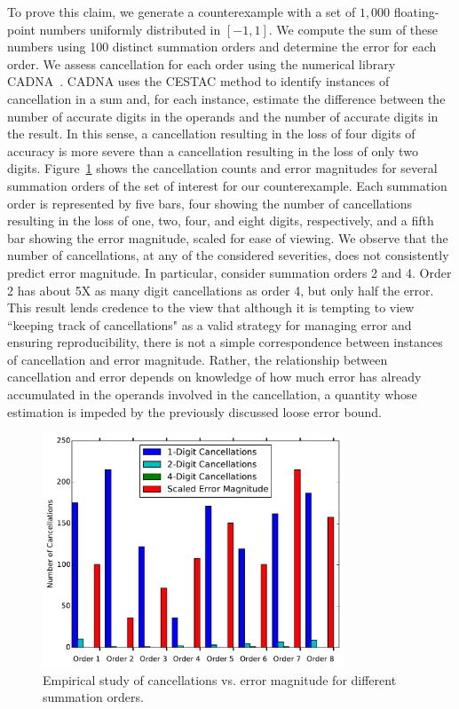 To prove this claim, we generate a counterexample with a set of
$1,000$ floating-point numbers uniformly distributed in $[-1, 1]$.  We
compute the sum of these numbers using 100 distinct summation orders
and determine the error for each order. We assess cancellation for
each order using the numerical library CADNA~\cite{jezequel}. CADNA
uses the CESTAC method to identify instances of cancellation in a sum
and, for each instance, estimate the difference between the number of
accurate digits in the operands and the number of accurate digits in
the result. In this sense, a cancellation resulting in the loss of
four digits of accuracy is more severe than a cancellation resulting
in the loss of only two digits. Figure~\ref{fig:errorcancellations}
shows the cancellation counts and error magnitudes for several
summation orders of the set of interest for our counterexample. Each
summation order is represented by five bars, four showing the number
of cancellations resulting in the loss of one, two, four, and eight
digits, respectively, and a fifth bar showing the error magnitude,
scaled for ease of viewing. We observe that the number of
cancellations, at any of the considered severities, does not
consistently predict error magnitude.  In particular, consider
summation orders 2 and 4. Order 2 has about 5X as many digit
cancellations as order 4, but only half the error. This result lends
credence to the view that although it is tempting to view ``keeping
track of cancellations" as a valid strategy for managing error and
ensuring reproducibility, there is not a simple correspondence between
instances of cancellation and error magnitude. Rather, the
relationship between cancellation and error depends on knowledge of
how much error has already accumulated in the operands involved in the
cancellation, a quantity whose estimation is impeded by the previously
discussed loose error bound.
\begin{figure}[!htb]
  \centering
  \includegraphics[width=0.80\textwidth]{chapter_2_figures/cancel_chart.pdf}
  \caption{Empirical study of cancellations vs. error magnitude
    for different summation orders.}
  \label{fig:errorcancellations}
\end{figure}


